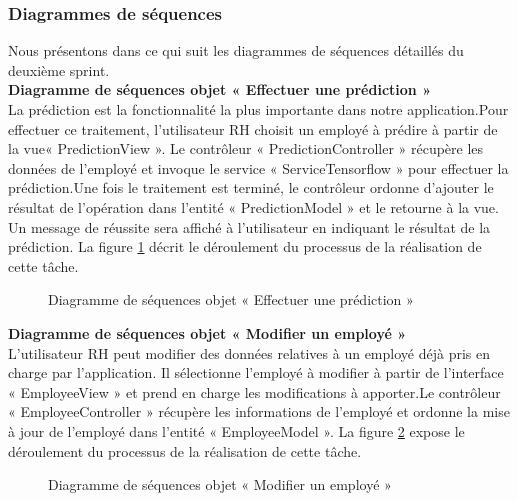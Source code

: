     \subsubsection{Diagrammes de séquences}
    Nous présentons dans ce qui suit les diagrammes de séquences détaillés du
deuxième sprint.\\
\textbf{Diagramme de séquences objet « Effectuer une prédiction »}\\
La prédiction est la fonctionnalité la plus importante dans notre application.\newline Pour effectuer ce traitement, l'utilisateur RH choisit un employé à prédire à partir de la vue\newline « PredictionView ». Le contrôleur « PredictionController » récupère les données de l'employé et invoque le service « ServiceTensorflow » pour effectuer la prédiction.\newline Une fois le traitement est terminé,
le contrôleur ordonne d'ajouter le résultat de l'opération dans l'entité  « PredictionModel » et le retourne à la vue.\newline
Un message de réussite sera affiché à l'utilisateur en indiquant le résultat de la prédiction.\newline
La figure \ref{fig:seqobjetprediction} décrit le déroulement du processus de la réalisation de cette tâche.
    \begin{figure}[htpb]
    \centering
    \caption{Diagramme de séquences objet « Effectuer une prédiction »}
    \label{fig:seqobjetprediction}
    \end{figure}
    
    \newpage
\textbf{Diagramme de séquences objet « Modifier un employé »}\\
L’utilisateur RH peut modifier des données relatives à un employé déjà pris en charge par l’application. Il sélectionne l'employé à modifier à partir de l’interface « EmployeeView » et prend en charge les modifications à apporter.\newline Le contrôleur « EmployeeController » récupère les informations de l'employé et ordonne la mise à jour de l'employé dans l'entité « EmployeeModel ».\newline
La figure \ref{fig:seqobjetmodifemploye} expose le déroulement du processus de la réalisation de cette tâche.

    \begin{figure}[htpb]
    \centering
    \caption{Diagramme de séquences objet « Modifier un employé »}
    \label{fig:seqobjetmodifemploye}
    \end{figure}
    

